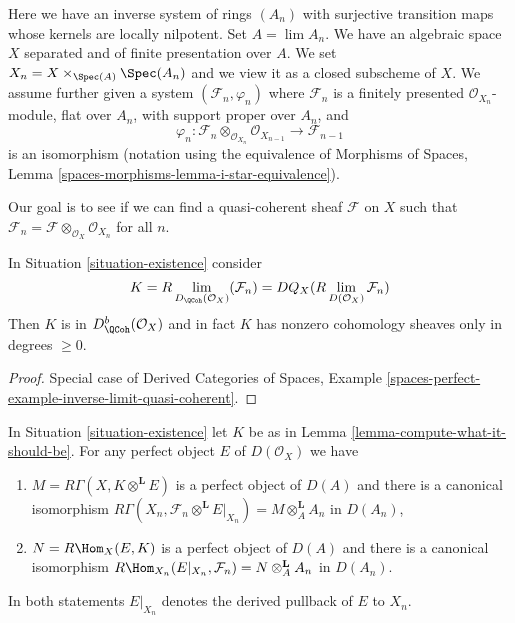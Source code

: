 \begin{situation}
\label{situation-existence}
Here we have an inverse system of rings $(A_n)$ with surjective transition
maps whose kernels are locally nilpotent. Set $A = \lim A_n$. We have an
algebraic space $X$ separated and of finite presentation over $A$.
We set $X_n = X \times_{\Spec(A)} \Spec(A_n)$ and we
view it as a closed subscheme of $X$. We assume further given a system
$(\mathcal{F}_n, \varphi_n)$ where $\mathcal{F}_n$ is a finitely presented
$\mathcal{O}_{X_n}$-module, flat over $A_n$, with support proper over $A_n$,
and
$$
\varphi_n :
\mathcal{F}_n \otimes_{\mathcal{O}_{X_n}} \mathcal{O}_{X_{n - 1}}
\longrightarrow
\mathcal{F}_{n - 1}
$$
is an isomorphism (notation using the equivalence of
Morphisms of Spaces, Lemma \ref{spaces-morphisms-lemma-i-star-equivalence}).
\end{situation}

\noindent
Our goal is to see if we can find a quasi-coherent sheaf $\mathcal{F}$
on $X$ such that
$\mathcal{F}_n = \mathcal{F} \otimes_{\mathcal{O}_X} \mathcal{O}_{X_n}$
for all $n$.

\begin{lemma}
\label{lemma-compute-what-it-should-be}
In Situation \ref{situation-existence} consider
$$
K = R\lim_{D_\QCoh(\mathcal{O}_X)}(\mathcal{F}_n) =
DQ_X(R\lim_{D(\mathcal{O}_X)}\mathcal{F}_n)
$$
Then $K$ is in $D^b_{\QCoh}(\mathcal{O}_X)$ and in fact
$K$ has nonzero cohomology sheaves only in degrees $\geq 0$.
\end{lemma}

\begin{proof}
Special case of
Derived Categories of Spaces, Example
\ref{spaces-perfect-example-inverse-limit-quasi-coherent}.
\end{proof}

\begin{lemma}
\label{lemma-compute-against-perfect}
In Situation \ref{situation-existence} let $K$ be as in
Lemma \ref{lemma-compute-what-it-should-be}. For any perfect
object $E$ of $D(\mathcal{O}_X)$ we have
\begin{enumerate}
\item $M = R\Gamma(X, K \otimes^\mathbf{L} E)$ is a perfect object of $D(A)$
and there is a canonical isomorphism
$R\Gamma(X_n, \mathcal{F}_n \otimes^\mathbf{L} E|_{X_n}) =
M \otimes_A^\mathbf{L} A_n$
in $D(A_n)$,
\item $N = R\Hom_X(E, K)$ is a perfect object of $D(A)$
and there is a canonical isomorphism
$R\Hom_{X_n}(E|_{X_n}, \mathcal{F}_n) = N \otimes_A^\mathbf{L} A_n$
in $D(A_n)$.
\end{enumerate}
In both statements $E|_{X_n}$ denotes the derived pullback
of $E$ to $X_n$.
\end{lemma}

